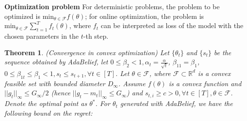 \documentclass{article}
\newtheorem{theorem}{Theorem}[section]
\newtheorem{lemma}[theorem]{Lemma}
\begin{document}
\textbf{Optimization problem} For deterministic problems, the problem to be optimized is  $\mathrm{min}_{\theta \in \mathcal{F}} f(\theta)$; for online optimization, the problem is $\mathrm{min}_{\theta \in \mathcal{F}} \sum_{t=1}^T f_t(\theta)$, where $f_t$ can be interpreted as loss of the model with the chosen parameters in the $t$-th step.
\begin{theorem}{(Convergence in convex optimization)}
\label{theorem:1}
Let $\{\theta_t\}$ and $\{s_t\}$ be the sequence obtained by AdaBelief, let $0 \leq \beta_2 < 1,\alpha_t = \frac{\alpha}{\sqrt{t}}$, $\beta_{11} = \beta_1$, $0 \leq \beta_{1t} \leq \beta_1 < 1, s_t \leq s_{t+1}, \forall t \in [T]$. %
 Let $\theta \in \mathcal{F}$, where $\mathcal{F} \subset \mathbb{R}^d$ is a convex feasible set with bounded diameter $D_{\infty}$. Assume $f(\theta)$ is a convex function and $ \vert  \vert  g_t  \vert  \vert_\infty \leq G_\infty / 2$ (hence $ \vert  \vert  g_t - m_t  \vert  \vert_\infty \leq G_\infty$) and $s_{t,i} \geq c > 0, \forall t \in [T], \theta \in \mathcal{F}$. Denote the optimal point as $\theta^*$. For $\theta_t$ generated with AdaBelief, we have the following bound on the regret: 
\end{theorem} 
\end{document}
